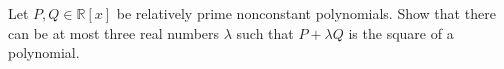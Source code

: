 Let $P,Q\in\mathbb{R}\left[x\right]$ be relatively prime nonconstant polynomials. Show that there can be at most three real numbers $\lambda$ such that $P+\lambda Q$ is the square of a polynomial.